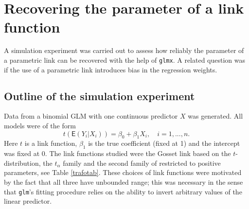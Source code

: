 \documentclass[a4paper,10 pt]{article}
\begin{document}
\section{Recovering the parameter of a link function}
A simulation experiment was carried out to assess how reliably the parameter of a parametric link can be recovered with the help of \texttt{glmx}. A related question was if the use of a parametric link introduces bias in the regression weights.

\subsection{Outline of the simulation experiment}
Data from a binomial GLM with one continuous predictor $X$ was generated.  All models were of the form
\[
t(\mathsf{E}(Y_i|X_i)) =\beta_0 +  \beta_1 X_i, \quad i = 1,...,n.
\]
Here $t$ is a link function, $\beta_1$ is the true coefficient (fixed at 1) and the intercept was fixed at $0$. The link functions studied were the Gosset link based on the $t$-distribution, the $t_\alpha$ family and the second family of \textcite{aranda1981two} restricted to positive parameters, see Table \ref{trafotab}. These choices of link functions were motivated by the fact that all three have unbounded range; this was necessary in the sense that \texttt{glm}'s fitting procedure relies on the ability to invert arbitrary values of the linear predictor.
\end{document}
